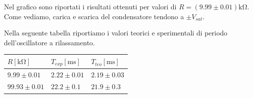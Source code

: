 Nel grafico sono riportati i risultati ottenuti per valori di $R=(9.99\pm0.01)\si{\kilo\ohm}$. Come vediamo, carica e scarica del condensatore tendono a $\pm V_{sat}$.




Nella seguente tabella riportiamo i valori teorici e sperimentali di periodo dell'oscillatore a rilassamento.

\begin{tabular}{|l|l|l|}
\hline
$R [\si{\kilo\ohm}]$	&  $T_{exp} [\si{\milli\second}]$          & $T_{teo} [\si{\milli\second}]$       \\
\hline
$9.99\pm0.01 $ & $2.22\pm0.01$ & $2.19 \pm 0.03$\\
\hline
$99.93\pm0.01 $ & $22.2\pm0.1$ & $21.9 \pm 0.3$\\
\hline
\end{tabular} 
